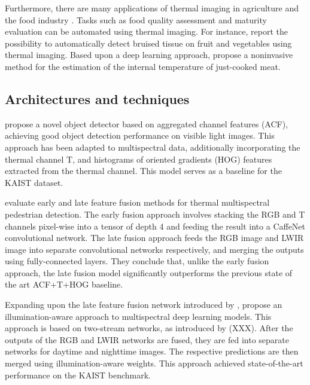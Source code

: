 \documentclass{l4proj}
\begin{document}
Furthermore, there are many applications of thermal imaging in agriculture and the food industry \citep{vadivambal_applications_2011}. Tasks such as food quality assessment and maturity evaluation can be automated using thermal imaging. For instance, \citet{gowen_applications_2010} report the possibility to automatically detect bruised tissue on fruit and vegetables using thermal imaging. Based upon a deep learning approach, \citet{ibarra_combined_2000} propose a noninvasive method for the estimation of the internal temperature of just-cooked meat. 


\subsection{Architectures and techniques}

\citet{dollar_fast_2014} propose a novel object detector based on aggregated channel features (ACF), achieving good object detection performance on visible light images. This approach has been adapted to multispectral data, additionally incorporating the thermal channel T, and histograms of oriented gradients (HOG) features \citep{dalal_histograms_2005} extracted from the thermal channel. This model serves as a baseline for the KAIST dataset.

\citet{wagner_multispectral_2016} evaluate early and late feature fusion methods for thermal multispectral pedestrian detection. The early fusion approach involves stacking the RGB and T channels pixel-wise into a tensor of depth 4 and feeding the result into a CaffeNet \citep{jia_caffe_2014} convolutional network. The late fusion approach feeds the RGB image and LWIR image into separate convolutional networks respectively, and merging the outputs using fully-connected layers. They conclude that, unlike the early fusion approach, the late fusion model significantly outperforms the previous state of the art ACF+T+HOG baseline.

Expanding upon the late feature fusion network introduced by \citet{wagner_multispectral_2016}, \citet{guan_fusion_2019} propose an illumination-aware approach to multispectral deep learning models. This approach is based on two-stream networks, as introduced by (XXX). After the outputs of the RGB and LWIR networks are fused, they are fed into separate networks for daytime and nighttime images. The respective predictions are then merged using illumination-aware weights. This approach achieved state-of-the-art performance on the KAIST benchmark.

\end{document}
